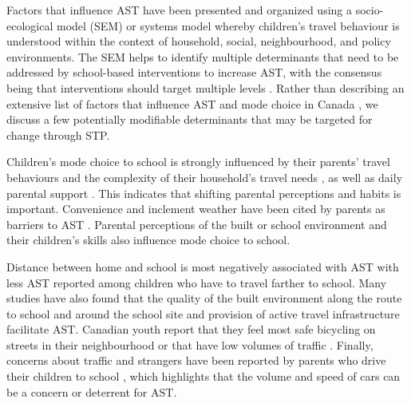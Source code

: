 \documentclass[preprint, 3p,
authoryear]{elsarticle} %
\begin{document}
Factors that influence AST have been presented and organized using a
socio-ecological model (SEM) \citep{mitraIndependentMobilityMode2013} or
systems model \citep{badlandDevelopmentSystemsModel2016} whereby
children's travel behaviour is understood within the context of
household, social, neighbourhood, and policy environments. The SEM helps
to identify multiple determinants that need to be addressed by
school-based interventions to increase AST, with the consensus being
that interventions should target multiple levels
\citep{mitraIndependentMobilityMode2013}. Rather than describing an
extensive list of factors that influence AST and mode choice in Canada
\citep[e.g.,][]{mammenUnderstandingDriveEscort2012, mitraIndependentMobilityMode2013, rothmanDeclineActiveSchool2018, wilsonUnderstandingChildParent2018},
we discuss a few potentially modifiable determinants that may be
targeted for change through STP.

Children's mode choice to school is strongly influenced by their
parents' travel behaviours and the complexity of their household's
travel needs \citep{buliungLivingJourneySchool2021}, as well as daily
parental support \citep{mahDoesParentalSupport2017a}. This indicates
that shifting parental perceptions and habits is important. Convenience
and inclement weather have been cited by parents as barriers to AST
\citep{buliungSchoolTravelPlanning2011}. Parental perceptions of the
built or school environment
\citep{demeesterParentalPerceivedNeighborhood2014, panterAttitudesSocialSupport2010}
and their children's skills
\citep{mammenUnderstandingDriveEscort2012, faulknerWhatQuickestEasiest2010}
also influence mode choice to school.

Distance between home and school is most negatively associated with AST
\citep{ikedaAssociationsChildrenActive2018, mammenUnderstandingDriveEscort2012, pontEnvironmentalCorrelatesChildren2009, rothmanDeclineActiveSchool2018}
with less AST reported among children who have to travel farther to
school. Many studies have also found that the quality of the built
environment along the route to school and around the school site
\citep{ikedaAssociationsChildrenActive2018, rothmanActiveSchoolTransportation2021}
and provision of active travel infrastructure
\citep{chenPromotingActiveStudent2018, pontEnvironmentalCorrelatesChildren2009}
facilitate AST. Canadian youth report that they feel most safe bicycling
on streets in their neighbourhood or that have low volumes of traffic
\citep{TACbikeinfra2020}. Finally, concerns about traffic and strangers
have been reported by parents who drive their children to school
\citep{mammenUnderstandingDriveEscort2012}, which highlights that the
volume and speed of cars can be a concern or deterrent for AST.
\end{document}
